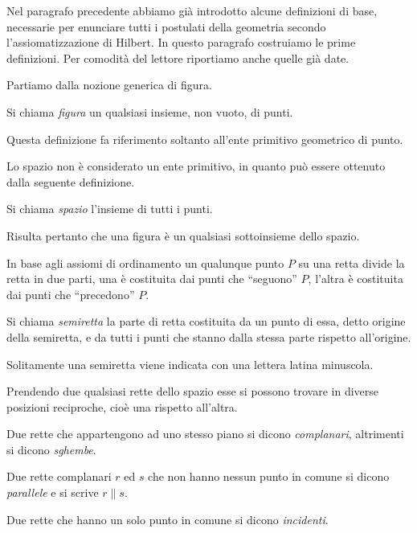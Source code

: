 Nel paragrafo precedente abbiamo già introdotto alcune definizioni di base, necessarie per enunciare tutti i postulati della geometria secondo l'assiomatizzazione di Hilbert. In questo paragrafo costruiamo le prime definizioni. Per comodità del lettore riportiamo anche quelle già date.

Partiamo dalla nozione generica di figura.
\begin{definizione}
Si chiama \emph{figura} un qualsiasi insieme, non vuoto, di punti.
\end{definizione}
Questa definizione fa riferimento soltanto all'ente primitivo geometrico di punto.

Lo spazio non è considerato un ente primitivo, in quanto può essere ottenuto dalla seguente definizione.
\begin{definizione}
Si chiama \emph{spazio} l'insieme di tutti i punti.
\end{definizione}
Risulta pertanto che una figura è un qualsiasi sottoinsieme dello spazio.

In base agli assiomi di ordinamento un qualunque punto $P$ su una retta divide la retta in due parti, una è costituita dai punti che ``seguono'' $P$, l'altra è costituita dai punti che ``precedono'' $P$.
\begin{definizione}
Si chiama \emph{semiretta} la parte di retta costituita da un punto di essa, detto origine della semiretta, e da tutti i punti che stanno dalla stessa parte rispetto all'origine.
\end{definizione}
Solitamente una semiretta viene indicata con una lettera latina minuscola.

Prendendo due qualsiasi rette dello spazio esse si possono trovare in diverse posizioni reciproche, cioè una rispetto all'altra.
\begin{definizione}
Due rette che appartengono ad uno stesso piano si dicono \emph{complanari}, altrimenti si dicono \emph{sghembe}.
\end{definizione}

\begin{definizione}
Due rette complanari $r$ ed $s$ che non hanno nessun punto in comune si dicono \emph{parallele} e si scrive $r\parallel s$.
\end{definizione}

\begin{definizione}
Due rette che hanno un solo punto in comune si dicono \emph{incidenti}.
\end{definizione}


